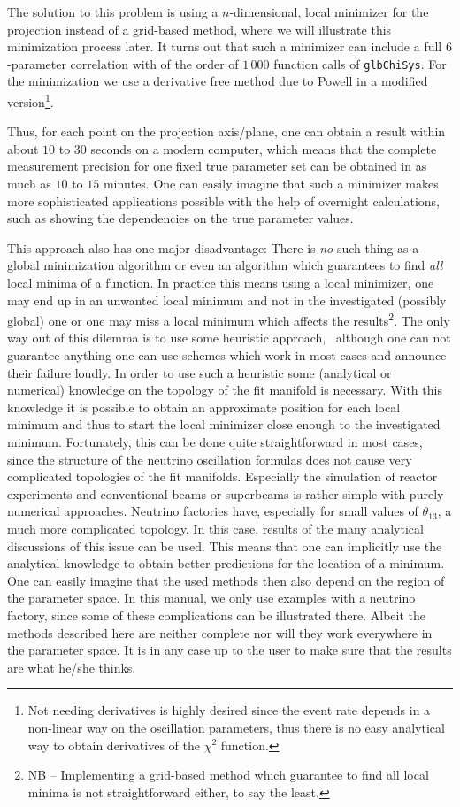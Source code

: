 The solution to this problem is using a $n$-dimensional, local 
minimizer for the projection instead of a grid-based method, where we will
illustrate this minimization process later. It turns out
that such a minimizer can include a full $6$-parameter correlation 
with of the order of $1\, 000$ function calls of {\tt glbChiSys}. For the 
minimization we use a derivative free method due to Powell in a 
modified~\cite{Brent:1973} version\footnote{Not needing derivatives is
highly desired since the event rate depends in a non-linear way on the
oscillation parameters, thus there is no easy analytical way
to obtain derivatives of the $\chi^2$ function.}.

Thus, for each point on the projection axis/plane, one can obtain a result within about $10$ to $30$ seconds on a modern computer, which means that the complete measurement precision for one fixed true parameter set can be obtained in as much as $10$ to $15$ minutes. One can easily imagine that such a minimizer makes more sophisticated applications possible with the help of overnight calculations, such as showing the dependencies on the true parameter values.

This approach also has one major disadvantage: There is \emph{no} such
thing as a global minimization algorithm or even an algorithm which guarantees
to find \emph{all} local minima of a function. In practice this means using 
 a local minimizer, one may end up in an unwanted local minimum and not in 
the investigated (possibly global) one or 
one may miss a local minimum which affects the results\footnote{NB -- 
Implementing a grid-based method which guarantee to find all local minima is
not straightforward either, to say the least.}. 
The only way out of this dilemma is to use some heuristic approach, \ie\
although one can not guarantee anything one can use schemes which work
in most cases and announce their failure loudly. In order to use such a
heuristic some (analytical or numerical) knowledge on the topology of 
the fit manifold is necessary. With this knowledge it is possible
to obtain an approximate position for each local minimum 
and thus to start the local minimizer 
close enough to the investigated minimum.
 Fortunately, this can be done quite straightforward in most cases, since 
the structure of the neutrino oscillation formulas does not cause very 
complicated topologies of the fit manifolds. Especially the simulation of 
reactor experiments and conventional beams or superbeams is rather simple 
with purely numerical
approaches. Neutrino factories have, especially for small values of
$\theta_{13}$, a much more complicated topology. In this case, results
of the many analytical discussions of this issue can be used. This means
 that one can implicitly use the analytical knowledge to obtain 
better predictions for the location of a minimum. One can easily imagine 
that the used methods then also depend
on the region of the parameter space. In this manual, we only use
examples with a neutrino factory, since some of these complications
can be illustrated there. Albeit the methods described here are neither
complete nor will they work everywhere in the parameter space. It is
in any case up to the user to make sure that the results are what he/she
thinks.

